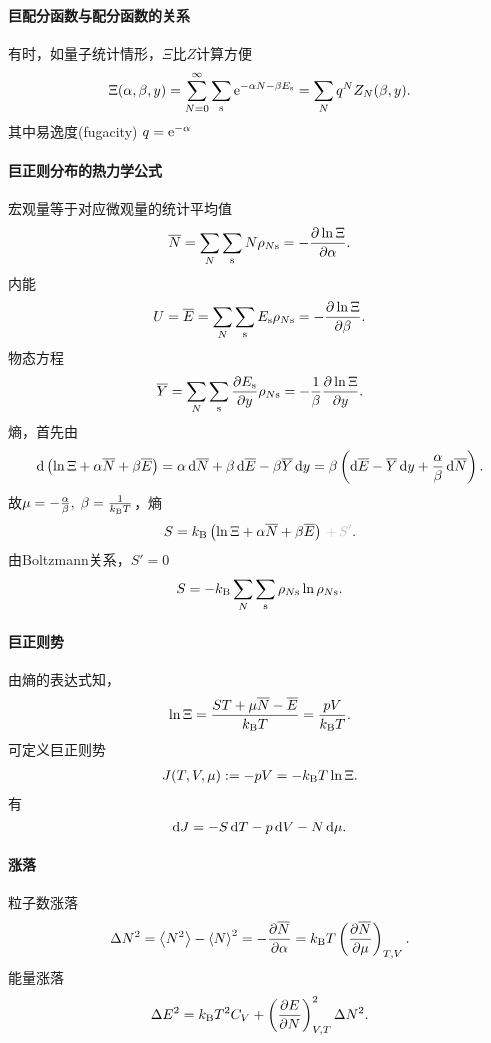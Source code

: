 \paragraph*{巨配分函数与配分函数的关系}有时，如量子统计情形，$\Xi$比$Z$计算方便
\[
	\Xi(\alpha,\beta,y)=\sum_{N=0}^\infty\sum_\mathrm s\mathop{}\!\mathrm{e}^{-\alpha N-\beta E_\mathrm s}=\sum_Nq^NZ_N(\beta,y).
\]
其中易逸度(fugacity) $q=\mathop{}\!\mathrm{e}^{-\alpha}$

\paragraph*{巨正则分布的热力学公式}宏观量等于对应微观量的统计平均值
\begin{align}
	\overline N=\sum_N\sum_\mathrm s N\rho_{N\mathrm s}=-\frac{\partial^{\;\!\!}\ln\Xi}{\partial \alpha^{\;\!\!}}.
\end{align}
内能
\begin{align}
	U=\overline E=\sum_N\sum_\mathrm s E_\mathrm s\rho_{N\mathrm s}=-\frac{\partial^{\;\!\!}\ln\Xi}{\partial \beta^{\;\!\!}}.
\end{align}
物态方程
\begin{align}
	\avg Y=\sum_N\sum_\st\pv{E_\st}y\rho_{N\st}=-\frac1\beta\pv{\ln\Xi}y.
\end{align}
熵，首先由
\begin{align*}
	\mathop{}\!\mathrm{d}\left(\ln\Xi+\alpha\overline N+\beta\overline E\right)=\alpha\mathop{}\!\mathrm{d}\overline N+\beta\mathop{}\!\mathrm{d}\overline E-\beta\overline Y\mathop{}\!\mathrm{d} y=\beta\left(\mathop{}\!\mathrm{d}\overline E-\overline Y\mathop{}\!\mathrm{d} y+\frac\alpha\beta\mathop{}\!\mathrm{d}\overline N\right).
\end{align*}
故$\mu=-\frac\alpha\beta,\;\beta=\frac1{k_{\mathrm B} T}$，熵
\begin{align}
	S=\kB\kh{\ln\Xi+\alpha\avg N+\beta\avg E}{\color{lightgray}\,+\,S'}.
\end{align}
由Boltzmann关系，$S'=0$
\begin{align}
	S=-k_{\mathrm B}\sum_N\sum_\mathrm s\rho_{N\mathrm s}\ln\rho_{N\mathrm s}.
\end{align}
\paragraph*{巨正则势}
由熵的表达式知，
\[
	\ln\Xi=\frac{ST+\mu\overline N-\overline E}{k_{\mathrm B} T}=\frac{pV}{k_{\mathrm B} T}.
\]
可定义巨正则势
\begin{align}
	J(T,V,\mu):=-pV=-k_{\mathrm B} T\ln\Xi.
\end{align}
有
\[
	\mathop{}\!\mathrm{d} J=-S\mathop{}\!\mathrm{d} T-p\mathop{}\!\mathrm{d} V-N\mathop{}\!\mathrm{d}\mu.
\]
\paragraph*{涨落}
粒子数涨落
\begin{align}
	\D N^2=\ave{N^2}-\ave N^2=-\pv{\avg N}\alpha=\kB T\kh{\pv{\avg N}\mu}_{T,V}.
\end{align}
能量涨落
\begin{align}
	\Delta E^2=k_{\mathrm B} T^2C_V+\left(\frac{\partial^{\;\!\!}E}{\partial N^{\;\!\!}}\right)_{V,T}^2\Delta N^2.
\end{align}
